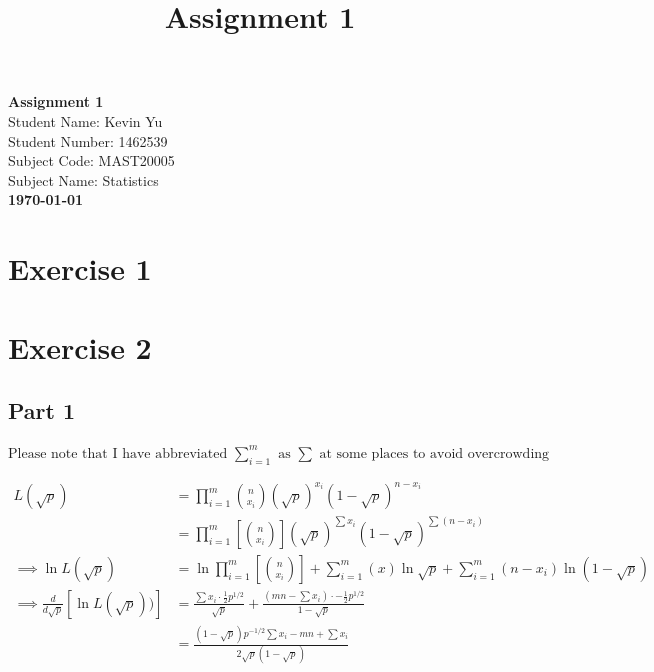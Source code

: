 \documentclass{article}
\title{Assignment 1}
\author{}
\date{}
\begin{document}
\begin{titlepage}
    \centering
    \vspace*{2in}
    {\Huge \textbf{Assignment 1}}\\[1.5cm]
    {\Large Student Name: Kevin Yu}\\[0.5cm]
    {\Large Student Number: 1462539}\\[0.5cm]
    {\Large Subject Code: MAST20005}\\[0.5cm]
    {\Large Subject Name: Statistics}\\[2in]
    \vfill
    \large \textbf{\today}
    \vfill
\end{titlepage}

\newpage
\section*{Exercise 1}

\newpage
\section*{Exercise 2}

\subsection*{Part 1}

$\text{Please note that I have abbreviated } \sum_{i=1}^m \text{ as } \sum \text{ at some places to avoid overcrowding}$

$$
\begin{aligned}
L(\sqrt{ p }) &= \prod_{i=1}^{m} \binom{n}{x_{i}} (\sqrt{ p })^{x_{i}}(1-\sqrt{ p })^{n-x_{i}} \\
&= \prod_{i=1}^m \left[ \binom{n}{x_{i}}\right] (\sqrt{ p })^{\sum x_{i}}(1-\sqrt{ p })^{\sum (n-x_{i})} \\
\implies \ln{L(\sqrt{ p })} &= \ln{\prod_{i=1}^m \left[ \binom{n}{x_{i}}\right]} + \sum_{i=1}^m{(x)}\ln{\sqrt{ p }}+\sum_{i=1}^m{(n-x_{i})}\ln{(1-\sqrt{p})} \\
\implies \frac{d}{d\sqrt{ p }}[\ln{L(\sqrt{ p })})] &= \frac{\sum x_{i} \cdot \frac{1}{2} p^{1/2}}{\sqrt{ p }} + \frac{\left( mn - \sum x_{i} \right) \cdot -\frac{1}{2} p^{1/2}}{1 - \sqrt{ p }} \\
&= \frac{(1-\sqrt{ p })p^{-1/2} \sum x_{i} - mn + \sum x_{i}}{2\sqrt{ p } (1-\sqrt{ p })}
\end{aligned}
$$
\end{document}
